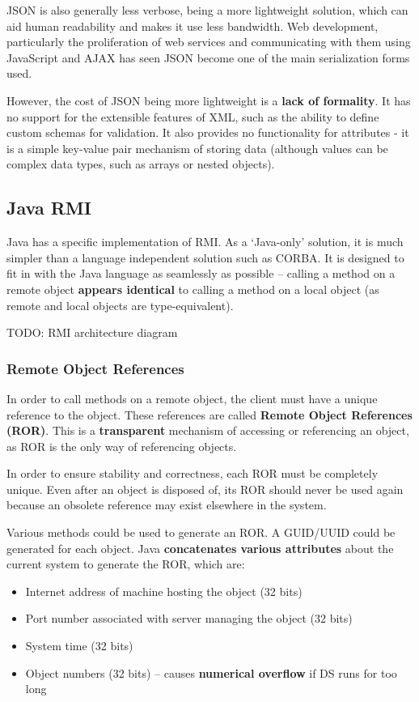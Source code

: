 \documentclass{article}
\begin{document}
JSON is also generally less verbose, being a more lightweight solution, which can aid human readability and makes it use less bandwidth. Web development, particularly the proliferation of web services and communicating with them using JavaScript and AJAX has seen JSON become one of the main serialization forms used.

However, the cost of JSON being more lightweight is a \textbf{lack of formality}. It has no support for the extensible features of XML, such as the ability to define custom schemas for validation. It also provides no functionality for attributes - it is a simple key-value pair mechanism of storing data (although values can be complex data types, such as arrays or nested objects).

\subsection{Java RMI}

Java has a specific implementation of RMI. As a `Java-only' solution, it is much simpler than a language independent solution such as CORBA. It is designed to fit in with the Java language as seamlessly as possible -- calling a method on a remote object \textbf{appears identical} to calling a method on a local object (as remote and local objects are type-equivalent). 

TODO: RMI architecture diagram

\subsubsection{Remote Object References}

In order to call methods on a remote object, the client must have a unique reference to the object. These references are called \textbf{Remote Object References (ROR)}. This is a \textbf{transparent} mechanism of accessing or referencing an object, as ROR is the only way of referencing objects.

In order to ensure stability and correctness, each ROR must be completely unique. Even after an object is disposed of, its ROR should never be used again because an obsolete reference may exist elsewhere in the system. 

Various methods could be used to generate an ROR. A GUID/UUID could be generated for each object. Java \textbf{concatenates various attributes} about the current system to generate the ROR, which are:
\begin{itemize}
	\item Internet address of machine hosting the object (32 bits)
	\item Port number associated with server managing the object (32 bits)
	\item System time (32 bits)
	\item Object numbers (32 bits) -- causes \textbf{numerical overflow} if DS runs for too long
\end{itemize}
\end{document}
